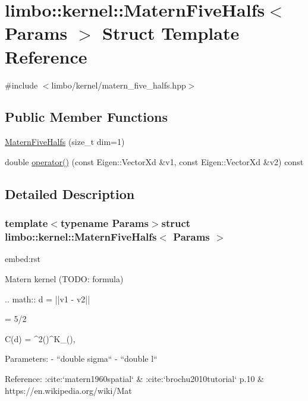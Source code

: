 \hypertarget{structlimbo_1_1kernel_1_1_matern_five_halfs}{}\section{limbo\+:\+:kernel\+:\+:Matern\+Five\+Halfs$<$ Params $>$ Struct Template Reference}
\label{structlimbo_1_1kernel_1_1_matern_five_halfs}


{\ttfamily \#include $<$limbo/kernel/matern\+\_\+five\+\_\+halfs.\+hpp$>$}

\subsection*{Public Member Functions}
\begin{DoxyCompactItemize}
\item 
\hyperlink{structlimbo_1_1kernel_1_1_matern_five_halfs_a6b7d9003e76fb0284e209b3b5d9527ee}{Matern\+Five\+Halfs} (size\+\_\+t dim=1)
\item 
double \hyperlink{structlimbo_1_1kernel_1_1_matern_five_halfs_a070ed97b62698e9c9d10f606254954e7}{operator()} (const Eigen\+::\+Vector\+Xd \&v1, const Eigen\+::\+Vector\+Xd \&v2) const 
\end{DoxyCompactItemize}


\subsection{Detailed Description}
\subsubsection*{template$<$typename Params$>$struct limbo\+::kernel\+::\+Matern\+Five\+Halfs$<$ Params $>$}

\begin{DoxyVerb}embed:rst

Matern kernel (TODO: formula)

.. math::
  d = ||v1 - v2||

  \nu = 5/2

  C(d) = \sigma^2\Bigg(\sqrt{2\nu}\Bigg)^\nu K_\nu\Bigg(\sqrt{2\nu}\Bigg),


Parameters:
  - ``double sigma``
  - ``double l``

Reference: :cite:`matern1960spatial` & :cite:`brochu2010tutorial` p.10 & https://en.wikipedia.org/wiki/Mat%
\end{DoxyVerb}
 

